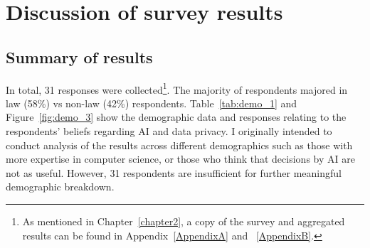 \chapter{Discussion of survey results}

\label{chapter5}

\section{Summary of results}
In total, 31 responses were collected\footnote{As mentioned in Chapter~\ref{chapter2}, a copy of the survey  and aggregated results can be found in Appendix~\ref{AppendixA} and ~\ref{AppendixB}.}. The majority of respondents majored in law (58\%) vs non-law (42\%) respondents. Table~\ref{tab:demo_1} and Figure~\ref{fig:demo_3} show the demographic data and responses relating to the respondents' beliefs regarding AI and data privacy. I originally intended to conduct analysis of the results across different demographics such as those with more expertise in computer science, or those who think that decisions by AI are not as useful. However, 31 respondents are insufficient for further meaningful demographic breakdown.

\begin{table}[!ht]
    \caption{Demographic breakdown of respondents according to academic discipline}
    \label{tab:demo_1}
\end{table}

